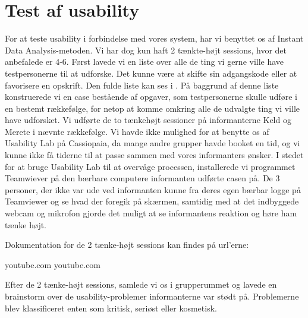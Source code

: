 \section{Test af usability}
\label{sec:usability}

For at teste usability i forbindelse med vores system, har vi benyttet os af Instant Data Analysis-metoden\cite{ida}. Vi har dog kun haft 2 tænkte-højt sessions, hvor det anbefalede er 4-6. Først lavede vi en liste over alle de ting vi gerne ville have testpersonerne til at udforske. Det kunne \fx være at skifte sin adgangskode eller at favorisere en opskrift. Den fulde liste kan ses i . På baggrund af denne liste konstruerede vi en case bestående af opgaver, som testpersonerne skulle udføre i en bestemt rækkefølge, for netop at komme omkring alle de udvalgte ting vi ville have udforsket. Vi udførte de to tænkehøjt sessioner på informanterne Keld og Merete i nævnte rækkefølge. Vi havde ikke mulighed for at benytte os af Usability Lab på Cassiopaia, da mange andre grupper havde booket en tid, og vi kunne ikke få tiderne til at passe sammen med vores informanters ønsker. I stedet for at bruge Usability Lab til at overvåge processen, installerede vi programmet Teamwiever på den bærbare computere informanten udførte casen på. De 3 personer, der ikke var ude ved informanten kunne fra deres egen bærbar logge på Teamviewer og se hvad der foregik på skærmen, samtidig med at det indbyggede webcam og mikrofon gjorde det muligt at se informantens reaktion og høre ham tænke højt.

Dokumentation for de 2 tænke-højt sessions kan findes på url'erne:
\begin{url}
youtube.com
youtube.com
\end{url}

Efter de 2 tænke-højt sessions, samlede vi os i grupperummet og lavede en brainstorm over de usability-problemer informanterne var stødt på. Problemerne blev klassificeret enten som kritisk, seriøst eller kosmetisk.


